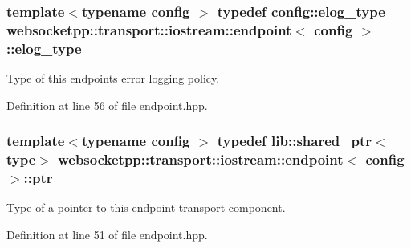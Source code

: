 \hypertarget{classwebsocketpp_1_1transport_1_1iostream_1_1endpoint_a0aafebd80866c13bef4caa45e48a8ede}{}
\subsubsection[{elog\+\_\+type}]{\setlength{\rightskip}{0pt plus 5cm}template$<$typename config $>$ typedef config\+::elog\+\_\+type {\bf websocketpp\+::transport\+::iostream\+::endpoint}$<$ config $>$\+::{\bf elog\+\_\+type}}\label{classwebsocketpp_1_1transport_1_1iostream_1_1endpoint_a0aafebd80866c13bef4caa45e48a8ede}


Type of this endpoint\textquotesingle{}s error logging policy. 



Definition at line 56 of file endpoint.\+hpp.

\hypertarget{classwebsocketpp_1_1transport_1_1iostream_1_1endpoint_a508eb595a20c2b0a15a27d68a7c0bd93}{}
\subsubsection[{ptr}]{\setlength{\rightskip}{0pt plus 5cm}template$<$typename config $>$ typedef lib\+::shared\+\_\+ptr$<${\bf type}$>$ {\bf websocketpp\+::transport\+::iostream\+::endpoint}$<$ config $>$\+::{\bf ptr}}\label{classwebsocketpp_1_1transport_1_1iostream_1_1endpoint_a508eb595a20c2b0a15a27d68a7c0bd93}


Type of a pointer to this endpoint transport component. 



Definition at line 51 of file endpoint.\+hpp.

\hypertarget{classwebsocketpp_1_1transport_1_1iostream_1_1endpoint_a709bba4a4e1e2b7829abe4aa55de8078}{}
